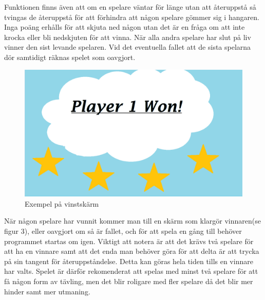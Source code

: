 \documentclass[12pt,a4paper]{article}
\begin{document}
Funktionen finns även att om en spelare väntar för länge utan att återuppstå så tvingas de återuppstå för att förhindra att någon spelare gömmer sig i hangaren.\\

Inga poäng erhålls för att skjuta ned någon utan det är en fråga om att inte krocka eller bli nedskjuten för att vinna. När alla andra spelare har slut på liv vinner den sist levande spelaren. Vid det eventuella fallet att de sista spelarna dör samtidigt räknas spelet som oavgjort.

\begin{figure}[H]
	\caption{Exempel på vinstskärm}
	\label{Win}
	\centering
	\includegraphics[width=\linewidth]{Win_Example.png}
\end{figure}

När någon spelare har vunnit kommer man till en skärm som klargör vinnaren(se figur 3), eller oavgjort om så är fallet, och för att spela en gång till behöver programmet startas om igen. Viktigt att notera är att det krävs två spelare för att ha en vinnare samt att det enda man behöver göra för att delta är att trycka på sin tangent för återuppståndelse. Detta kan göras hela tiden tills en vinnare har valts. Spelet är därför rekomenderat att spelas med minst två spelare för att få någon form av tävling, men det blir roligare med fler spelare då det blir mer hinder samt mer utmaning.
\end{document}

